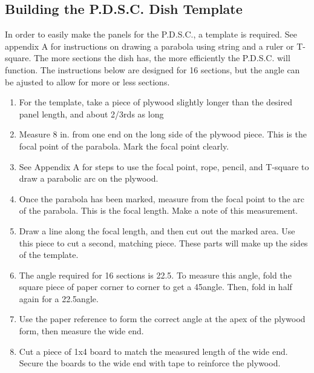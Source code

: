 \documentclass[titlepage]{article}
\begin{document}
        \subsection{Building the P.D.S.C. Dish Template}
        In order to easily make the panels for the P.D.S.C., a template is required.  See appendix A for instructions
        on drawing a parabola using string and a ruler or T-square.  The more sections the dish has,
        the more efficiently the P.D.S.C. will function.  The instructions below are designed for 16 sections,
        but the angle can be ajusted to allow for more or less sections.
            \begin{enumerate}
                \item For the template, take a piece of plywood slightly longer than the desired panel length, and about 2/3rds as long
                \item Measure 8 in. from one end on the long side of the plywood piece. This is the focal point of the parabola. Mark the focal point clearly.
                \item See Appendix A for steps to use the focal point, rope, pencil, and T-square to draw a parabolic arc on the plywood.
                \item Once the parabola has been marked, measure from the focal point to the arc of the parabola.  This is the focal length.  Make a note of this measurement.
                \item Draw a line along the focal length, and then cut out the marked area. Use this piece to cut a second, matching piece. These parts will make up the sides of the template.
                \item The angle required for 16 sections is 22.5\degree. To measure this angle, fold the square piece of paper corner to corner to get a 45\degree angle. Then, fold in half again for a 22.5\degree angle.
                \item Use the paper reference to form the correct angle at the apex of the plywood form, then measure the wide end.
                \item Cut a piece of 1x4 board to match the measured length of the wide end.  Secure the boards to the wide end with tape to reinforce the plywood.
                \begin{figure}[!htb]

\end{figure}
\end{enumerate}
\end{document}

